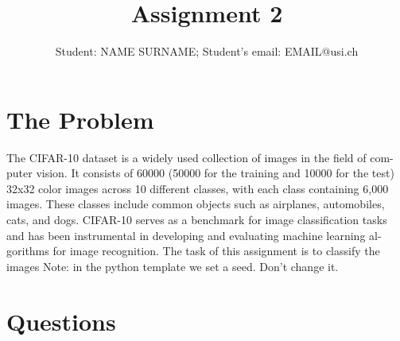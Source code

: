 \documentclass[a4paper]{article}
\title{Assignment 2}
\author{Student: NAME SURNAME; Student's email: EMAIL@usi.ch}
\begin{document}
	\maketitle
\section*{The Problem}
The CIFAR-10 dataset is a widely used collection of images in the field of com- puter vision. It consists of 60000 (50000 for the training and 10000 for the test) 32x32 color images across 10 different classes, with each class containing 6,000 images. These classes include common objects such as airplanes, automobiles, cats, and dogs. CIFAR-10 serves as a benchmark for image classification tasks and has been instrumental in developing and evaluating machine learning al- gorithms for image recognition. The task of this assignment is to classify the images
Note: in the python template we set a seed. Don’t change it.

\section*{Questions}
\end{document}
